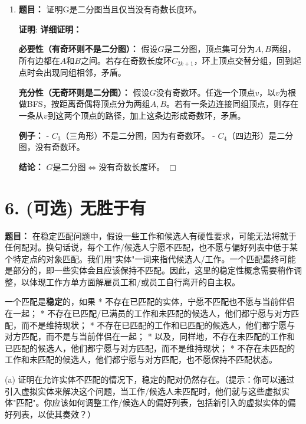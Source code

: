 \documentclass[11pt]{article}
\newenvironment{qparts}{\begin{enumerate}[{(}a{)}]}{\end{enumerate}}
\def\endproofmark{$\Box$}
\newenvironment{proof}{\par{\bf 证明}:}{\endproofmark\smallskip}
\begin{document}
\begin{qparts}
\begin{proof}
\textbf{结论：} $G$的所有边可以被$m$条不重复的路径覆盖。
\end{proof}

\item \textbf{题目：} 证明G是二分图当且仅当没有奇数长度环。
\begin{proof}
\textbf{详细证明：}

\textbf{必要性（有奇环则不是二分图）：}  
假设$G$是二分图，顶点集可分为$A,B$两组，所有边都在$A$和$B$之间。若存在奇数长度环$C_{2k+1}$，环上顶点交替分组，回到起点时会出现同组相邻，矛盾。

\textbf{充分性（无奇环则是二分图）：}  
假设$G$没有奇数环。任选一个顶点$v$，以$v$为根做BFS，按距离奇偶将顶点分为两组$A,B$。若有一条边连接同组顶点，则存在一条从$v$到这两个顶点的路径，加上这条边形成奇数环，矛盾。

\textbf{例子：}  
- $C_3$（三角形）不是二分图，因为有奇数环。
- $C_4$（四边形）是二分图，没有奇数环。

\textbf{结论：} $G$是二分图$\iff$没有奇数长度环。
\end{proof}
\end{qparts}

\section*{6. (可选) 无胜于有}
\textbf{题目：}
在稳定匹配问题中，假设一些工作和候选人有硬性要求，可能无法将就于任何配对。换句话说，每个工作/候选人宁愿不匹配，也不愿与偏好列表中低于某个特定点的对象匹配。我们用"实体"一词来指代候选人/工作。一个匹配最终可能是部分的，即一些实体会且应该保持不匹配。因此，这里的稳定性概念需要稍作调整，以体现工作方单方面解雇员工和/或员工自行离开的自主权。

一个匹配是\textbf{稳定}的，如果
\newline
* 不存在已匹配的实体，宁愿不匹配也不愿与当前伴侣在一起；\newline
* 不存在已匹配/已满员的工作和未匹配的候选人，他们都宁愿与对方匹配，而不是维持现状；\newline
* 不存在已匹配的工作和已匹配的候选人，他们都宁愿与对方匹配，而不是与当前伴侣在一起；\newline
* 以及，同样地，不存在未匹配的工作和已匹配的候选人，他们都宁愿与对方匹配，而不是维持现状；\newline
* 不存在未匹配的工作和未匹配的候选人，他们都宁愿与对方匹配，也不愿保持不匹配状态。

(a) 证明在允许实体不匹配的情况下，稳定的配对仍然存在。（提示：你可以通过引入虚拟实体来解决这个问题，当工作/候选人未匹配时，他们就与这些虚拟实体"匹配"。你应该如何调整工作/候选人的偏好列表，包括新引入的虚拟实体的偏好列表，以使其奏效？）
\end{document}

